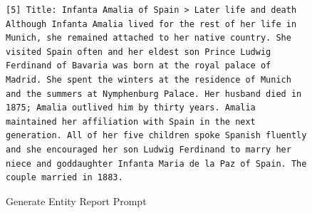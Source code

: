\begin{figure}[htb]
\begin{lstlisting}
[5] Title: Infanta Amalia of Spain > Later life and death
Although Infanta Amalia lived for the rest of her life in Munich, she remained attached to her native country. She visited Spain often and her eldest son Prince Ludwig Ferdinand of Bavaria was born at the royal palace of Madrid. She spent the winters at the residence of Munich and the summers at Nymphenburg Palace. Her husband died in 1875; Amalia outlived him by thirty years. Amalia maintained her affiliation with Spain in the next generation. All of her five children spoke Spanish fluently and she encouraged her son Ludwig Ferdinand to marry her niece and goddaughter Infanta Maria de la Paz of Spain. The couple married in 1883.

\end{lstlisting}

\caption{Generate Entity Report Prompt}
\label{lst:generate_entity_report}
\end{figure}






